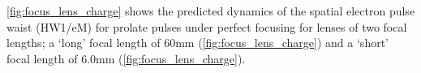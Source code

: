 \ref{fig:focus_lens_charge} shows the predicted dynamics of the spatial electron pulse waist (HW1/eM) for prolate pulses under perfect focusing for lenses of two focal lengths; a `long' focal length of 60mm (\ref{fig:focus_lens_charge}) and a `short' focal length of 6.0mm (\ref{fig:focus_lens_charge}).
